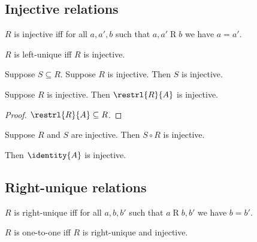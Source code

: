 
\subsection{Injective relations}

\begin{definition}\label{injective}
    $R$ is injective iff for all $a,a',b$ such that $a, a'\mathrel{R} b$ we have $a = a'$.
\end{definition}

\begin{abbreviation}\label{leftunique}
    $R$ is left-unique iff $R$ is injective.
\end{abbreviation}

\begin{proposition}\label{subseteq_of_injective_is_injective}
    Suppose $S\subseteq R$.
    Suppose $R$ is injective.
    Then $S$ is injective.
\end{proposition}

\begin{proposition}\label{restrl_injective}
    Suppose $R$ is injective.
    Then $\restrl{R}{A}$ is injective.
\end{proposition}
\begin{proof}
    $\restrl{R}{A}\subseteq R$.
\end{proof}

\begin{proposition}\label{circ_injective}
    Suppose $R$ and $S$ are injective.
    Then $S\circ R$ is injective.
\end{proposition}

\begin{proposition}\label{identity_injective}
    Then $\identity{A}$ is injective.
\end{proposition}

\subsection{Right-unique relations}

\begin{definition}\label{rightunique}
    $R$ is right-unique iff
    for all $a,b,b'$ such that $a\mathrel{R} b, b'$ we have $b = b'$.
\end{definition}

\begin{abbreviation}\label{onetoone}
    $R$ is one-to-one iff $R$ is right-unique and injective.
\end{abbreviation}


